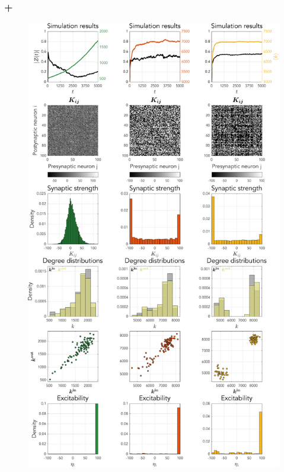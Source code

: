 \begin{frame}
\frametitle{\STDP + \IP}
\begin{figure}[H]
\centering
\includegraphics[trim=0cm 28.5cm 0cm 7.1cm, clip=true, height = 0.475\textheight]{../Figures/Learning/STDPandIP.pdf}
\label{fig:STDP}
\end{figure}
\begin{figure}[H]
\centering

\end{figure}
\end{frame}
